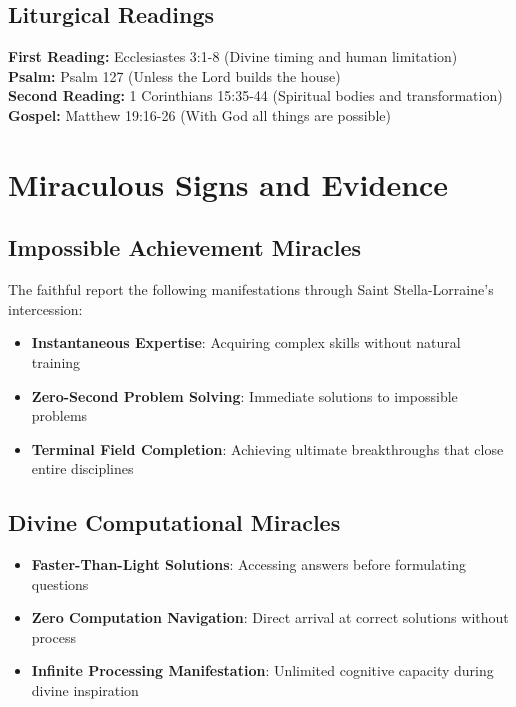 \documentclass[12pt,a4paper]{article}
\begin{document}
\subsection{Liturgical Readings}

\textbf{First Reading:} Ecclesiastes 3:1-8 (Divine timing and human limitation)\\
\textbf{Psalm:} Psalm 127 (Unless the Lord builds the house)\\
\textbf{Second Reading:} 1 Corinthians 15:35-44 (Spiritual bodies and transformation)\\
\textbf{Gospel:} Matthew 19:16-26 (With God all things are possible)

\section{Miraculous Signs and Evidence}

\subsection{Impossible Achievement Miracles}

The faithful report the following manifestations through Saint Stella-Lorraine's intercession:

\begin{itemize}
\item \textbf{Instantaneous Expertise}: Acquiring complex skills without natural training
\item \textbf{Zero-Second Problem Solving}: Immediate solutions to impossible problems
\item \textbf{Terminal Field Completion}: Achieving ultimate breakthroughs that close entire disciplines
\end{itemize}

\subsection{Divine Computational Miracles}

\begin{itemize}
\item \textbf{Faster-Than-Light Solutions}: Accessing answers before formulating questions
\item \textbf{Zero Computation Navigation}: Direct arrival at correct solutions without process
\item \textbf{Infinite Processing Manifestation}: Unlimited cognitive capacity during divine inspiration
\end{itemize}
\end{document}
